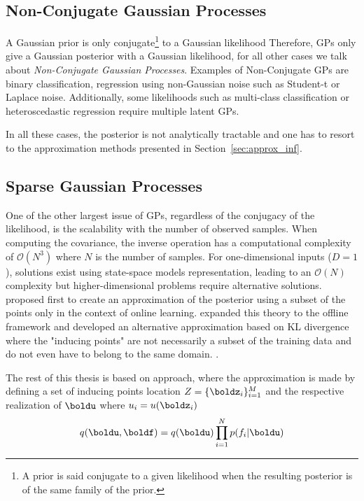 \subsection{Non-Conjugate Gaussian Processes}

A Gaussian prior is only conjugate\footnote{A prior is said conjugate to a given likelihood when the resulting posterior is of the same family of the prior.} to a Gaussian likelihood
Therefore, \ac{GPs} only give a Gaussian posterior with a Gaussian likelihood, for all other cases we talk about \textit{Non-Conjugate Gaussian Processes}.
Examples of Non-Conjugate \ac{GPs} are binary classification, regression using non-Gaussian noise such as Student-t or Laplace noise.
Additionally, some likelihoods such as multi-class classification or heteroscedastic regression require multiple latent \ac{GPs}.

In all these cases, the posterior is not analytically tractable and one has to resort to the approximation methods presented in Section~\ref{sec:approx_inf}.

\subsection{Sparse Gaussian Processes}
One of the other largest issue of \ac{GPs}, regardless of the conjugacy of the likelihood, is the scalability with the number of observed samples.
When computing the covariance, the inverse operation has a computational complexity of $\mathcal{O}(N^3)$ where $N$ is the number of samples.
For one-dimensional inputs ($D=1$), solutions exist using state-space models representation, leading to an $\mathcal{O}(N)$ complexity but higher-dimensional problems require alternative solutions.
\citet{csato2002sparse} proposed first to create an approximation of the posterior using a subset of the points only in the context of online learning.
\citet{snelsonSparseGaussianProcesses2009} expanded this theory to the offline framework and \citet{Titsias2009} developed an alternative approximation based on KL divergence where the "inducing points" are not necessarily a subset of the training data and do not even have to belong to the same domain. .

The rest of this thesis is based on \citet{Titsias2009} approach, where the approximation is made by defining a set of inducing points location $Z=\{\boldz_i\}_{i=1}^M$ and the respective realization of $\boldu$ where $u_i = u(\boldz_i)$
\begin{align}
    q(\boldu,\boldf) = q(\boldu)\prod_{i=1}^N p(f_i|\boldu)
    \label{eq:titsias_assumption}
\end{align}


